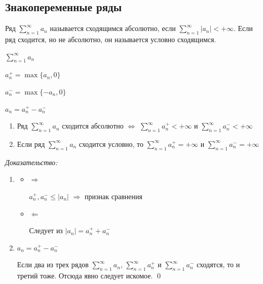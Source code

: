 \subsection{Знакопеременные ряды}

\begin{defn}{}{}
    Ряд \( \sum\limits_{n = 1}^{\infty} a_n \) называется сходящимся абсолютно,
    если \( \sum\limits_{n = 1}^{\infty} |a_n| < +\infty \).
    Если ряд сходится, но не абсолютно, он называется условно сходящимся.
\end{defn}

\begin{lemma}{}{}
    \( \sum\limits_{n = 1}^{\infty} a_n \)

    \( a_n^+ = \max \{ a_n, 0 \} \)

    \( a_n^- = \max \{ -a_n, 0 \} \)

    \( a_n = a_n^+ - a_n^- \)

    \begin{enumerate}
        \item
            Ряд \( \sum\limits_{n = 1}^{\infty} a_n \) сходится абсолютно
            \( \Leftrightarrow \)
            \( \sum\limits_{n = 1}^{\infty}  a_n^+ < +\infty \) и  \( \sum\limits_{n = 1}^{\infty} a_n^- < +\infty \)
        \item
            Если ряд \( \sum\limits_{n = 1}^{\infty} a_n \) сходится условно,
            то \( \sum\limits_{n = 1}^{\infty} a_n^+ = +\infty \)
            и \( \sum\limits_{n = 1}^{\infty} a_n^- = +\infty \)
    \end{enumerate}
\end{lemma}

\textit{Доказательство:}
\begin{enumerate}
    \item
        \begin{itemize}
            \item
                \( \Rightarrow \)

                \( a_n^+, a_n^- \leq |a_n| \) \( \Rightarrow \) признак сравнения
            \item
                \( \Leftarrow \)

                Следует из \( |a_n| = a_n^+ + a_n^- \)
        \end{itemize}
    \item
        \( a_n = a_n^+ - a_n^- \)

        Если два из трех рядов \( \sum\limits_{n = 1}^{\infty} a_n \),
        \( \sum\limits_{n = 1}^{\infty} a_n^+ \) и \( \sum\limits_{n = 1}^{\infty} a_n^- \)
        сходятся, то и третий тоже.
        Отсюда явно следует искомое.
\qed
\end{enumerate}

